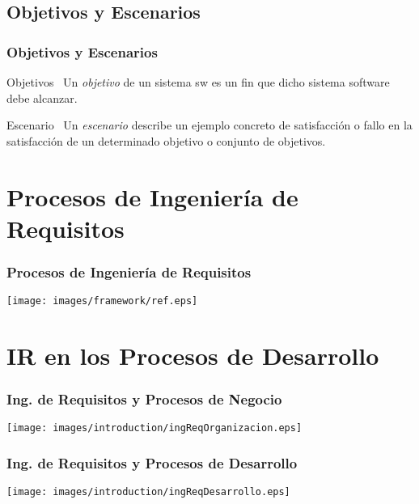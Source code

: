 \documentclass[a4paper,slidestop,xcolor=pst,dvips,blue]{beamer}
\begin{document}
\subsection{Objetivos y Escenarios}

\begin{frame}
    \frametitle{Objetivos y Escenarios}
    \begin{block}{Objetivos~\cite{lamsweerde:2001}}
        Un \alert{\emph{objetivo}} de un sistema sw es un fin que dicho sistema software debe alcanzar.
    \end{block}
     {
        \begin{block}{Escenario~\cite{pohl:2010}}
            Un \alert{\emph{escenario}} describe un ejemplo concreto de satisfacción o fallo en la satisfacción de un determinado objetivo o conjunto de objetivos.
        \end{block}
    }
\end{frame}

\section{Procesos de Ingeniería de Requisitos}

\begin{frame}[c]
    \frametitle{Procesos de Ingeniería de Requisitos}
    \begin{center}
		\texttt{[image: images/framework/ref.eps]}
    \end{center}
\end{frame}

\section{IR en los Procesos de Desarrollo}

\begin{frame}[c]
    \frametitle{Ing. de Requisitos y Procesos de Negocio}
    \begin{center}
			\texttt{[image: images/introduction/ingReqOrganizacion.eps]}
    \end{center}
\end{frame}

\begin{frame}
    \frametitle{Ing. de Requisitos y Procesos de Desarrollo}
    \begin{center}
			\texttt{[image: images/introduction/ingReqDesarrollo.eps]}
    \end{center}
\end{frame}
\end{document}
